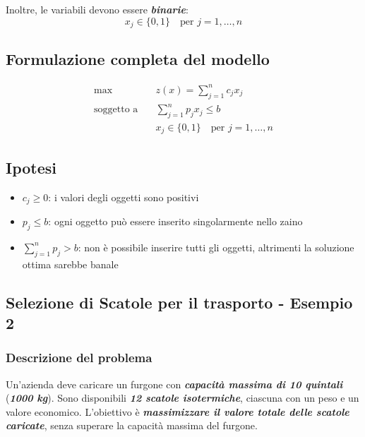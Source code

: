 Inoltre, le variabili devono essere \textbf{\textit{binarie}}:
\[
x_j \in \{0, 1\} \quad \text{per } j = 1, \ldots, n
\]

\subsection{Formulazione completa del modello}
\[
\begin{aligned}
\max \quad & z(x) = \sum_{j=1}^{n} c_j x_j \\
\text{soggetto a} \quad & \sum_{j=1}^{n} p_j x_j \leq b \\
& x_j \in \{0, 1\} \quad \text{per } j = 1, \dots, n
\end{aligned}
\]

\subsection{Ipotesi}
\begin{itemize}
    \item $c_j \geq 0$: i valori degli oggetti sono positivi
    \item $p_j \leq b$: ogni oggetto può essere inserito singolarmente nello zaino
    \item $\sum_{j=1}^{n} p_j > b$: non è possibile inserire tutti gli oggetti, altrimenti la soluzione ottima sarebbe banale
\end{itemize}

\subsection{Selezione di Scatole per il trasporto - Esempio 2}
\subsubsection{Descrizione del problema}

Un'azienda deve caricare un furgone con \textbf{\textit{capacità massima di 10 quintali}} 
(\textbf{\textit{1000 kg}}). Sono disponibili \textbf{\textit{12 scatole isotermiche}}, ciascuna con un peso e un valore 
economico. L'obiettivo è \textbf{\textit{massimizzare il valore totale delle scatole caricate}}, 
senza superare la capacità massima del furgone.

